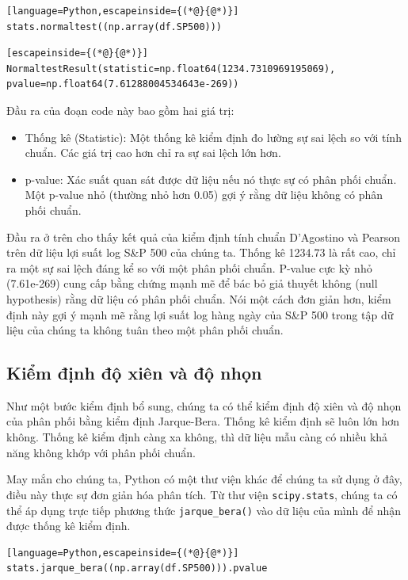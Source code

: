 \begin{lstlisting}[language=Python,escapeinside={(*@}{@*)}]
stats.normaltest((np.array(df.SP500)))
\end{lstlisting}

\begin{lstlisting}[escapeinside={(*@}{@*)}]
NormaltestResult(statistic=np.float64(1234.7310969195069), pvalue=np.float64(7.61288004534643e-269))
\end{lstlisting}

Đầu ra của đoạn code này bao gồm hai giá trị:

\begin{itemize}
  \item Thống kê (Statistic): Một thống kê kiểm định đo lường sự sai lệch so với tính chuẩn. Các giá trị cao hơn chỉ ra sự sai lệch lớn hơn.
  \item p-value: Xác suất quan sát được dữ liệu nếu nó thực sự có phân phối chuẩn. Một p-value nhỏ (thường nhỏ hơn 0.05) gợi ý rằng dữ liệu không có phân phối chuẩn.
\end{itemize}
Đầu ra ở trên cho thấy kết quả của kiểm định tính chuẩn D'Agostino và Pearson trên dữ liệu lợi suất log S\&P 500 của chúng ta. Thống kê 1234.73 là rất cao, chỉ ra một sự sai lệch đáng kể so với một phân phối chuẩn. P-value cực kỳ nhỏ (7.61e-269) cung cấp bằng chứng mạnh mẽ để bác bỏ giả thuyết không (null hypothesis) rằng dữ liệu có phân phối chuẩn. Nói một cách đơn giản hơn, kiểm định này gợi ý mạnh mẽ rằng lợi suất log hàng ngày của S\&P 500 trong tập dữ liệu của chúng ta không tuân theo một phân phối chuẩn.

\subsection{Kiểm định độ xiên và độ nhọn}

Như một bước kiểm định bổ sung, chúng ta có thể kiểm định độ xiên và độ nhọn của phân phối bằng kiểm định Jarque-Bera. Thống kê kiểm định sẽ luôn lớn hơn không. Thống kê kiểm định càng xa không, thì dữ liệu mẫu càng có nhiều khả năng không khớp với phân phối chuẩn.

May mắn cho chúng ta, Python có một thư viện khác để chúng ta sử dụng ở đây, điều này thực sự đơn giản hóa phân tích. Từ thư viện \texttt{scipy.stats}, chúng ta có thể áp dụng trực tiếp phương thức \texttt{jarque\_\allowbreak{}bera()} vào dữ liệu của mình để nhận được thống kê kiểm định.

\begin{lstlisting}[language=Python,escapeinside={(*@}{@*)}]
stats.jarque_bera((np.array(df.SP500))).pvalue
\end{lstlisting}

